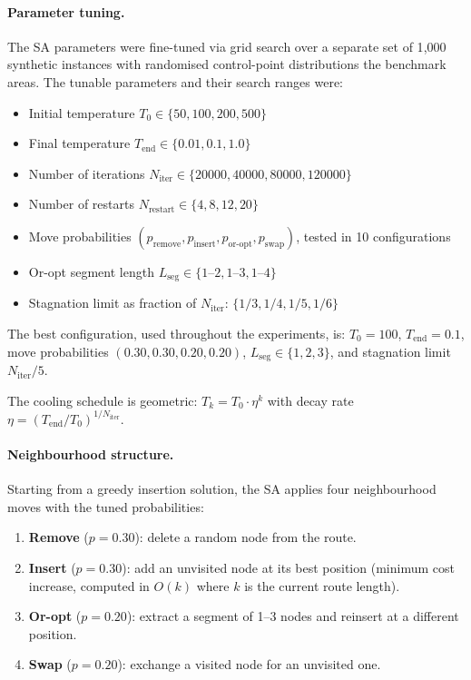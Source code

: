 \documentclass[11pt,a4paper]{article}
\begin{document}
\paragraph{Parameter tuning.}
The SA parameters were fine-tuned via grid search over a separate set of 1{,000 synthetic instances with randomised control-point distributions the benchmark areas.}
The tunable parameters and their search ranges were:
\begin{itemize}[nosep]
  \item Initial temperature $T_0 \in \{50, 100, 200, 500\}$
  \item Final temperature $T_{\text{end}} \in \{0.01, 0.1, 1.0\}$
  \item Number of iterations $N_{\text{iter}} \in \{20000, 40000, 80000, 120000\}$
  \item Number of restarts $N_{\text{restart}} \in \{4, 8, 12, 20\}$
  \item Move probabilities $(p_{\text{remove}}, p_{\text{insert}}, p_{\text{or-opt}}, p_{\text{swap}})$, tested in 10 configurations
  \item Or-opt segment length $L_{\text{seg}} \in \{1\text{--}2, 1\text{--}3, 1\text{--}4\}$
  \item Stagnation limit as fraction of $N_{\text{iter}}$: $\{1/3, 1/4, 1/5, 1/6\}$
\end{itemize}

The best configuration, used throughout the experiments, is: $T_0 = 100$, $T_{\text{end}} = 0.1$, move probabilities $(0.30, 0.30, 0.20, 0.20)$, $L_{\text{seg}} \in \{1,2,3\}$, and stagnation limit $N_{\text{iter}}/5$.

The cooling schedule is geometric: $T_k = T_0 \cdot \eta^k$ with decay rate $\eta = (T_{\text{end}}/T_0)^{1/N_{\text{iter}}}$.

\paragraph{Neighbourhood structure.}
Starting from a greedy insertion solution, the SA applies four neighbourhood moves with the tuned probabilities:
\begin{enumerate}[nosep]
  \item \textbf{Remove} ($p = 0.30$): delete a random node from the route.
  \item \textbf{Insert} ($p = 0.30$): add an unvisited node at its best position (minimum cost increase, computed in $O(k)$ where $k$ is the current route length).
  \item \textbf{Or-opt} ($p = 0.20$): extract a segment of 1--3 nodes and reinsert at a different position.
  \item \textbf{Swap} ($p = 0.20$): exchange a visited node for an unvisited one.
\end{enumerate}
\end{document}
